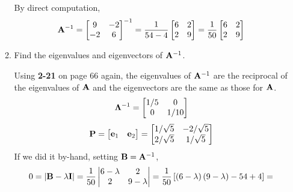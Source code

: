 \begin{enumerate}[font=\bfseries]
\begin{enumerate}
            By direct computation,
            \[
                \bold{A}^{-1} = 
                \begin{bmatrix}
                    9 & -2 \\
                    -2 & 6
                \end{bmatrix}^{-1} = 
                \frac{1}{54-4}
                \begin{bmatrix}
                    6 & 2 \\
                    2 & 9
                \end{bmatrix} =
                \frac{1}{50}
                \begin{bmatrix}
                    6 & 2 \\
                    2 & 9
                \end{bmatrix}
            \]
            \item Find the eigenvalues and eigenvectors of $\bold{A}^{-1}$.
            \par
            Using \textbf{2-21} on page 66 again, the eigenvalues of $\bold{A}^{-1}$ are the reciprocal of the eigenvalues of $\bold{A}$ and the eigenvectors are the same as those for $\bold{A}$.
            \[
                \bold{\Lambda}^{-1}
                =
                \begin{bmatrix}
                    1/5 & 0 \\
                    0 & 1/10
                \end{bmatrix}
            \]
            \[
                \bold{P} =
                \begin{bmatrix}
                    \bold{e}_1 & \bold{e}_2
                \end{bmatrix} =
                \begin{bmatrix}
                    1/\sqrt{5} & -2/\sqrt{5} \\
                    2/\sqrt{5} & 1/\sqrt{5}
                \end{bmatrix}
            \]
            If we did it by-hand, setting $\bold{B} = \bold{A}^{-1}$,
            \[
                0 = \left|\bold{B} - \lambda\bold{I}\right|
                =
                \frac{1}{50}
                \left|
                \begin{matrix}
                    6 - \lambda & 2 \\
                    2 & 9 - \lambda
                \end{matrix}
                \right| = 
                \frac{1}{50} \left[\left(6 - \lambda\right)\left(9 - \lambda\right) - 54 + 4\right] =
\]
\end{enumerate}
\end{enumerate}
